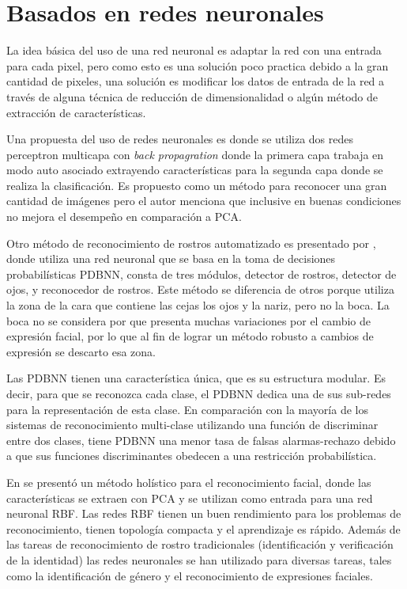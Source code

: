 
\section{Basados en redes neuronales}

La idea básica del uso de una red neuronal es adaptar la red con una entrada para cada pixel, pero como esto es una solución poco practica debido a la gran cantidad de pixeles, una solución es modificar los datos de entrada de la red a través de alguna técnica de reducción de dimensionalidad o algún método de extracción de características.

Una propuesta del uso de redes neuronales es \cite{cottrell1990face}  donde se utiliza dos redes perceptron multicapa con \textit{back propagration} donde la primera capa trabaja en modo auto asociado extrayendo características para la segunda capa donde se realiza la clasificación. Es propuesto como un método para reconocer una gran cantidad de imágenes pero el autor menciona que inclusive en buenas condiciones no mejora el desempeño en comparación a \ac{PCA}.

Otro método de reconocimiento de rostros automatizado es presentado por \cite{lin1997face}, donde utiliza una red neuronal que se basa en la toma de decisiones probabilísticas \ac{PDBNN}, consta de tres módulos, detector de rostros, detector de ojos, y reconocedor de rostros. Este método se diferencia de otros porque utiliza la zona de la cara que contiene las cejas los ojos y la nariz, pero no la boca. La boca no se considera por que presenta muchas variaciones por el cambio de expresión facial, por lo que al fin de lograr un método robusto a cambios de expresión se descarto esa zona.

Las \acf{PDBNN} tienen una característica única, que es su estructura modular. Es decir, para que se reconozca cada clase, el \ac{PDBNN} dedica una de sus sub-redes para la representación de esta clase. En comparación con la mayoría de los sistemas de reconocimiento multi-clase utilizando una función de discriminar entre dos clases, tiene \ac{PDBNN} una menor tasa de falsas alarmas-rechazo debido a que sus funciones discriminantes obedecen a una restricción probabilística.

En \cite{er2002face} se  presentó un método holístico para el reconocimiento facial, donde las características se extraen con \ac{PCA} y se utilizan como entrada para una red neuronal \ac{RBF}. Las redes \ac{RBF} tienen un buen rendimiento para los problemas de reconocimiento, tienen topología compacta y el aprendizaje es rápido. Además de las tareas de reconocimiento de rostro tradicionales  (identificación y verificación de la identidad) las redes neuronales se han utilizado para diversas tareas, tales como la identificación de género y el reconocimiento de expresiones faciales. 

